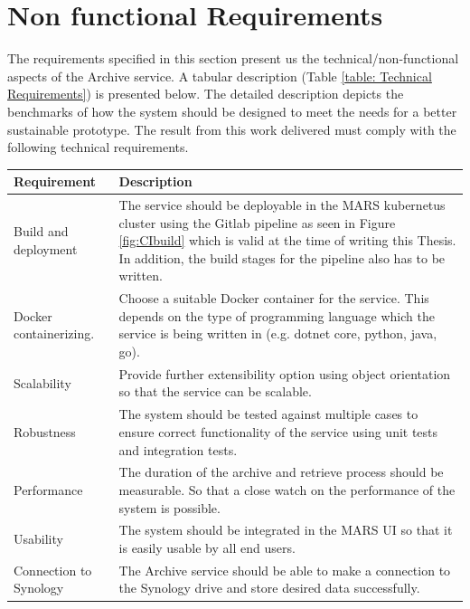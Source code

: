 \section{Non functional Requirements}
\label{section:technicalReq}
The requirements specified in this section present us the technical/non-functional aspects of the Archive service. A tabular description 
(Table \ref{table: Technical Requirements}) is presented below.
The detailed description depicts the benchmarks of how the system should be designed to meet the needs for a better sustainable prototype.
The result from this work delivered must comply with the following technical requirements.

    \begin{longtable}{|p{3cm}|p{12cm}|}
            \hline
                \textbf{Requirement}  & \textbf{Description}\\
            \hline
                 Build and deployment & 
                 The service should be deployable in the MARS kubernetus \cite{kubernetes} cluster using the Gitlab pipeline as seen in Figure \ref{fig:CIbuild}
                 which is valid at the time of writing this Thesis. In addition,
                 the build stages for the pipeline also has to be written. \\
            \hline
                Docker containerizing.
                & Choose a suitable Docker container \cite[p.~7 - 8]{Torre2017} for the service. This depends on the type of programming language which 
                the service is being
                written in (e.g. dotnet core, python, java, go).\\
            \hline
                 Scalability & Provide further extensibility option using object orientation so that the service can be scalable.\\
            \hline
                 Robustness & The system should be tested against multiple cases to ensure correct functionality of the service using unit tests and
                 integration tests.\\    
            \hline
                 Performance & The duration of the archive and retrieve process should be measurable. So that a close watch on the performance of the system is 
                 possible. \\    
            \hline
                 Usability & The system should be integrated in the MARS UI so that it is easily usable by all end users.\\    
            \hline
                 Connection to Synology & The Archive service should be able to make a connection to the Synology drive and store desired data successfully.\\ 

\end{longtable}
